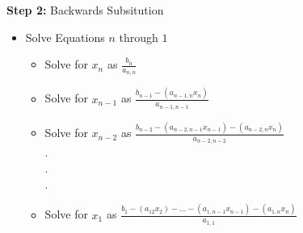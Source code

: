 \documentclass[fleqn]{beamer} %
\newcommand{\sectionIVsubsectionIItitle}{}
\newcommand{\sectionIVsubsectionIIItitle}{}
\begin{document}
			\begin{frame}
				\frametitle{\sectionIVsubsectionIItitle}
				\bigskip

				 {\bf Step 2:} Backwards Subsitution
				\begin{itemize}
					\item Solve Equations $n$ through $1$ \\
						\begin{itemize}
							\item Solve for $x_n$ as $\frac{b_n}{a_{n,n}}$\\
					
							\item Solve for $x_{n-1}$ as $\frac{b_{n-1}-(a_{n-1,n}x_n)}{a_{n-1,n-1}}$ \\
							
							\item Solve for $x_{n-2}$ as $\frac{b_{n-2}-(a_{n-2,n-1}x_{n-1})-(a_{n-2,n}x_{n})}{a_{n-2,n-2}}$\\
							. \\ .\\ . \\					 
							\item Solve for $x_{1}$ as $\frac{b_{1}-(a_{12}x_{2})- . . . -(a_{1,n-1}x_{n-1})-(a_{1,n}x_{n})}{a_{1,1}}$\\	
									
						\end{itemize}
				\end{itemize}

				\btVFill
			\end{frame}	

		\subsection{\sectionIVsubsectionIIItitle}\label{sectionIVsubsectionIII}
\end{document}
